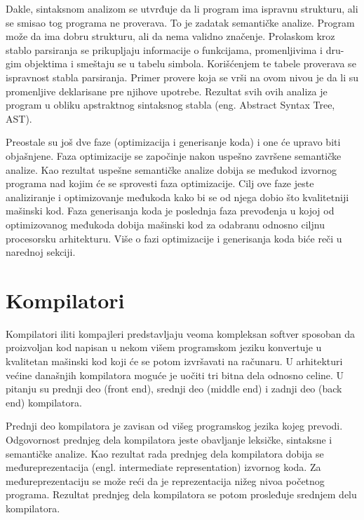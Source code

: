 \documentclass[12pt,oneside]{memoir}
\begin{document}
Dakle, sintaksnom analizom se utvrđuje da li program ima ispravnu
strukturu, ali se smisao tog programa ne proverava. To je zadatak semantičke
analize. Program može da ima dobru strukturu, ali da nema validno značenje. Prolaskom
kroz stablo parsiranja se prikupljaju informacije o funkcijama, promenljivima i dru-
gim objektima i smeštaju se u tabelu simbola. Korišćenjem te tabele proverava se
ispravnost stabla parsiranja. Primer provere koja se vrši na ovom nivou je da li su
promenljive deklarisane pre njihove upotrebe. Rezultat svih ovih analiza je program
u obliku apstraktnog sintaksnog stabla (eng. Abstract Syntax Tree, AST).

Preostale su još dve faze (optimizacija i generisanje koda) i one će upravo biti objašnjene.
Faza optimizacije se započinje nakon uspešno završene semantičke analize. Kao rezultat uspešne semantičke analize dobija se međukod izvornog programa nad kojim će se sprovesti faza optimizacije. Cilj ove faze jeste analiziranje i optimizovanje međukoda kako bi se od njega dobio što kvalitetniji mašinski kod. Faza generisanja koda je poslednja faza prevođenja u kojoj od optimizovanog međukoda dobija mašinski kod za odabranu odnosno ciljnu procesorsku arhitekturu.
Više o fazi optimizacije i generisanja koda biće reči u narednoj sekciji.

\section{Kompilatori}
Kompilatori iliti kompajleri predstavljaju veoma kompleksan softver sposoban da 
proizvoljan kod napisan u nekom višem programskom jeziku konvertuje u 
kvalitetan mašinski kod koji će se potom izvršavati na računaru. U arhitekturi 
većine današnjih kompilatora moguće je uočiti tri bitna dela odnosno celine.
U pitanju su prednji deo (front end), srednji deo (middle end) i zadnji deo (back end) kompilatora.

Prednji deo kompilatora je zavisan od višeg programskog jezika kojeg prevodi. Odgovornost prednjeg dela kompilatora jeste obavljanje leksičke, 
sintaksne i semantičke analize. Kao rezultat rada prednjeg dela kompilatora 
dobija se međureprezentacija (engl. intermediate representation) izvornog koda.
Za međureprezentaciju se može reći da je reprezentacija nižeg nivoa početnog 
programa. Rezultat prednjeg dela kompilatora se potom prosleđuje srednjem delu kompilatora.
\end{document}
